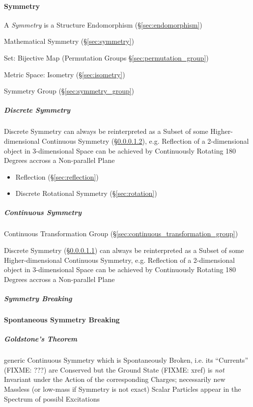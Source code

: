 \paragraph{Symmetry}\label{sec:structure_symmetry}\hfill

A \emph{Symmetry} is a Structure Endomorphism (\S\ref{sec:endomorphism})

Mathematical Symmetry (\S\ref{sec:symmetry})

Set: Bijective Map (Permutation Groups \S\ref{sec:permutation_group})

Metric Space: Isometry (\S\ref{sec:isometry})

Symmetry Group (\S\ref{sec:symmetry_group})



\subparagraph{Discrete Symmetry}\label{sec:discrete_symmetry}\hfill

Discrete Symmetry can always be reinterpreted as a Subset of some
Higher-dimensional Continuous Symmetry (\S\ref{sec:continuous_symmetry}), e.g.
Reflection of a 2-dimensional object in 3-dimensional Space can be achieved by
Continuously Rotating 180 Degrees accross a Non-parallel Plane

\begin{itemize}
  \item Reflection (\S\ref{sec:reflection})
  \item Discrete Rotational Symmetry (\S\ref{sec:rotation})
\end{itemize}



\subparagraph{Continuous Symmetry}\label{sec:continuous_symmetry}\hfill

Continuous Transformation Group
(\S\ref{sec:continuous_transformation_group})

Discrete Symmetry (\S\ref{sec:discrete_symmetry}) can always be reinterpreted as
a Subset of some Higher-dimensional Continuous Symmetry, e.g. Reflection of a
2-dimensional object in 3-dimensional Space can be achieved by Continuously
Rotating 180 Degrees accross a Non-parallel Plane



\subparagraph{Symmetry Breaking}\label{sec:symmetry_breaking}\hfill

\textbf{Spontaneous Symmetry Breaking}



\subparagraph{Goldstone's Theorem}\label{sec:goldstones_theorem}\hfill

generic Continuous Symmetry which is Spontaneously Broken, i.e. its ``Currents''
(FIXME: ???) are Conserved but the Ground State (FIXME: xref) is \emph{not}
Invariant under the Action of the corresponding Charges; necessarily new
Massless (or low-mass if Symmetry is not exact) Scalar Particles appear in the
Spectrum of possibl Excitations

